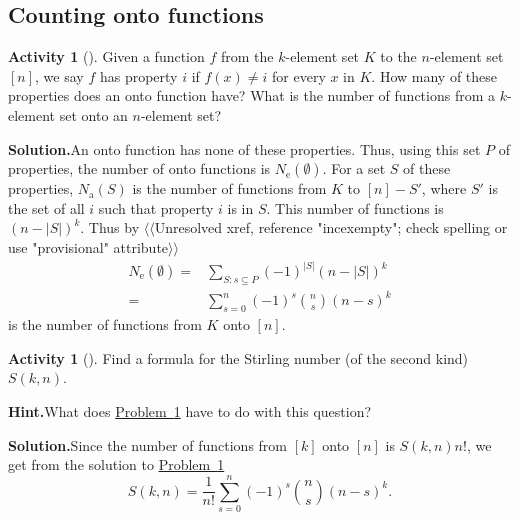 \documentclass[10pt,]{book}
\theoremstyle{plain}
\theoremstyle{definition}
\newtheorem{activity}[project]{Activity}
\numberwithin{equation}{chapter}
\newcommand{\amp}{&}
\begin{document}
\subsection[{Counting onto functions}]{Counting onto functions}\label{subsection-56}
\begin{activity}[]\label{numontofun}
Given a function \(f\) from the \(k\)-element set \(K\) to the \(n\)-element set \([n]\), we say \(f\) has property \(i\) if \(f(x)\not= i\) for every \(x\) in \(K\). How many of these properties does an onto function have? What is the number of functions from a \(k\)-element set onto an \(n\)-element set?%
\par\medskip\noindent%
\textbf{Solution.}\quad An onto function has none of these properties. Thus, using this set \(P\) of properties, the number of onto functions is \(N_{\mbox{e} }(\emptyset)\). For a set \(S\) of these properties, \(N_{\mbox{a} }(S)\) is the number of functions from \(K\) to \([n]-S'\), where \(S'\) is the set of all \(i\) such that property \(i\) is in \(S\). This number of functions is \((n-|S|)^k\). Thus by {$\langle\langle$Unresolved xref, reference "incexempty"; check spelling or use "provisional" attribute$\rangle\rangle$}%
\begin{align*}
N_{\mbox{e} }(\emptyset)  =\amp  \sum_{S:s\subseteq P} (-1)^{|S|}
(n-|S|)^k\\
=\amp \sum_{s=0}^n (-1)^s\binom{n}{s}(n-s)^k
\end{align*}
is the number of functions from \(K\) onto \([n]\).%
\end{activity}
\begin{activity}[]\label{activity-233}
Find a formula for the Stirling number (of the second kind) \(S(k,n)\).%
\par\medskip\noindent%
\textbf{Hint.}\quad What does \hyperref[numontofun]{Problem~\ref{numontofun}} have to do with this question?%
\par\medskip\noindent%
\textbf{Solution.}\quad Since the number of functions from \([k]\) onto \([n]\) is \(S(k,n)n!\), we get from the solution to \hyperref[numontofun]{Problem~\ref{numontofun}}%
\begin{equation*}
S(k,n) = \frac{1}{n!}\sum_{s=0}^n (-1)^s\binom{n}{s}(n-s)^k.
\end{equation*}
%
\end{activity}
\typeout{************************************************}
\typeout{************************************************}
\end{document}
